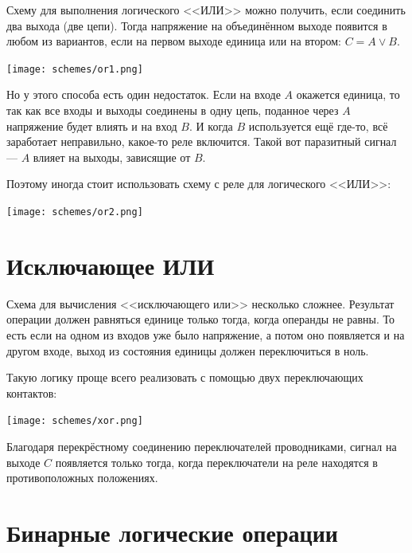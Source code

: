 Схему для выполнения логического <<ИЛИ>> можно получить, если соединить два выхода
(две цепи). Тогда напряжение на объединённом выходе появится в любом
из вариантов, если на первом выходе единица или на втором: $C = A \lor B$.

\begin{center}
\texttt{[image: schemes/or1.png]}
\end{center}

Но у этого способа есть один недостаток. Если на входе $A$ окажется единица,
то так как все входы и выходы соединены в одну цепь, поданное через $A$ напряжение
будет влиять и на вход $B$. И когда $B$ используется ещё где-то,
всё заработает неправильно, какое-то реле включится.
Такой вот паразитный сигнал --- $A$ влияет на выходы, зависящие от $B$.

Поэтому иногда стоит использовать схему с реле для логического <<ИЛИ>>:

\begin{center}
\texttt{[image: schemes/or2.png]}
\end{center}


\section{Исключающее ИЛИ}

Схема для вычисления <<исключающего или>> несколько сложнее.
Результат операции должен равняться единице только тогда,
когда операнды не равны. То есть если на одном из входов уже
было напряжение, а потом оно появляется и на другом входе,
выход из состояния единицы должен переключиться в ноль.

Такую логику проще всего реализовать с помощью двух переключающих контактов:

\begin{center}
\texttt{[image: schemes/xor.png]}
\end{center}

Благодаря перекрёстному соединению переключателей проводниками,
сигнал на выходе $C$ появляется только тогда, когда переключатели на реле
находятся в противоположных положениях.

\section{Бинарные логические операции}

